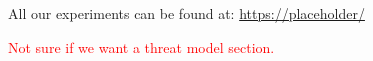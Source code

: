 \vspace*{0.5em}
All our experiments can be found at: \url{https://placeholder/} 

\textcolor{red}{Not sure if we want a threat model section.}





